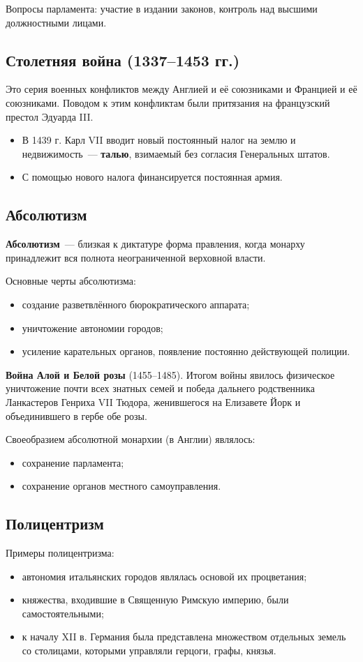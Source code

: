 \documentclass[a4paper, 12pt]{article}
\begin{document}
Вопросы парламента: участие в издании законов, контроль над высшими
должностными лицами.

\subsection{Столетняя война (1337--1453 гг.)}
Это серия военных конфликтов между Англией и её союзниками и Францией и её
союзниками. Поводом к этим конфликтам были притязания на французский престол
Эдуарда III.
\begin{itemize}[noitemsep]
  \item В 1439 г. Карл VII вводит новый постоянный налог на землю
  и недвижимость~--- \textbf{талью}, взимаемый без согласия Генеральных штатов.
  \item С помощью нового налога финансируется постоянная армия.
\end{itemize}

\subsection{Абсолютизм}
\textbf{Абсолютизм}~--- близкая к диктатуре форма правления, когда монарху
принадлежит вся полнота неограниченной верховной власти.

Основные черты абсолютизма:
\begin{itemize}[noitemsep]
  \item создание разветвлённого бюрократического аппарата;
  \item уничтожение автономии городов;
  \item усиление карательных органов, появление постоянно действующей
  полиции.
\end{itemize}

\textbf{Война Алой и Белой розы} (1455--1485). Итогом войны явилось
физическое уничтожение почти всех знатных семей и победа дальнего
родственника Ланкастеров Генриха VII Тюдора, женившегося на Елизавете Йорк
и объединившего в гербе обе розы.

Своеобразием абсолютной монархии (в Англии) являлось:
\begin{itemize}[noitemsep]
  \item сохранение парламента;
  \item сохранение органов местного самоуправления.
\end{itemize}

\subsection{Полицентризм}
Примеры полицентризма:
\begin{itemize}[noitemsep]
  \item автономия итальянских городов являлась основой их процветания;
  \item княжества, входившие в Священную Римскую империю, были
  самостоятельными;
  \item к началу XII в. Германия была представлена множеством отдельных
  земель со столицами, которыми управляли герцоги, графы, князья.
\end{itemize}
\end{document}
